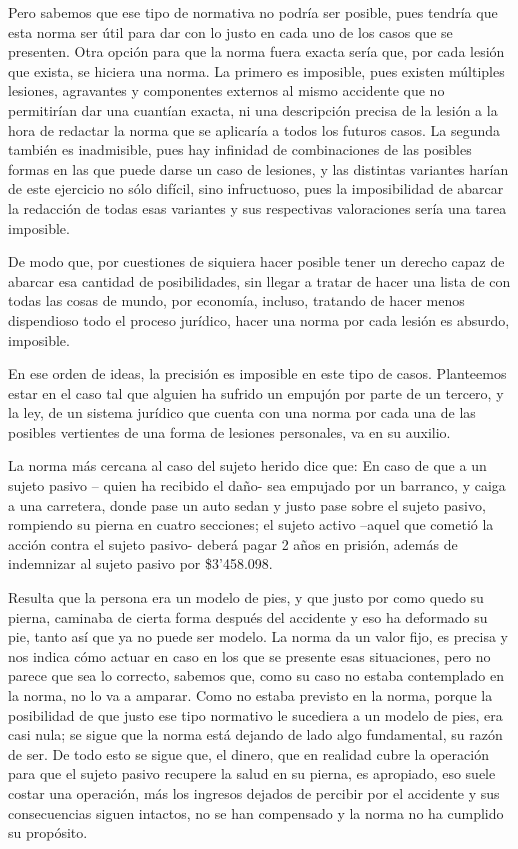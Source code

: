 \documentclass[]{book}
\begin{document}
\begin{refsection}
Pero sabemos que ese tipo de normativa no podría ser posible, pues
tendría que esta norma ser útil para dar con lo justo en cada uno de los
casos que se presenten. Otra opción para que la norma fuera exacta sería
que, por cada lesión que exista, se hiciera una norma. La primero es
imposible, pues existen múltiples lesiones, agravantes y componentes
externos al mismo accidente que no permitirían dar una cuantían exacta,
ni una descripción precisa de la lesión a la hora de redactar la norma
que se aplicaría a todos los futuros casos. La segunda también es
inadmisible, pues hay infinidad de combinaciones de las posibles formas
en las que puede darse un caso de lesiones, y las distintas variantes
harían de este ejercicio no sólo difícil, sino infructuoso, pues la
imposibilidad de abarcar la redacción de todas esas variantes y sus
respectivas valoraciones sería una tarea imposible.

De modo que, por cuestiones de siquiera hacer posible tener un derecho
capaz de abarcar esa cantidad de posibilidades, sin llegar a tratar de
hacer una lista de con todas las cosas de mundo, por economía, incluso,
tratando de hacer menos dispendioso todo el proceso jurídico, hacer una
norma por cada lesión es absurdo, imposible.

En ese orden de ideas, la precisión es imposible en este tipo de casos.
Planteemos estar en el caso tal que alguien ha sufrido un empujón por
parte de un tercero, y la ley, de un sistema jurídico que cuenta con una
norma por cada una de las posibles vertientes de una forma de lesiones
personales, va en su auxilio.

La norma más cercana al caso del sujeto herido dice que: En caso de que
a un sujeto pasivo -- quien ha recibido el daño- sea empujado por un
barranco, y caiga a una carretera, donde pase un auto sedan y justo pase
sobre el sujeto pasivo, rompiendo su pierna en cuatro secciones; el
sujeto activo --aquel que cometió la acción contra el sujeto pasivo-
deberá pagar 2 años en prisión, además de indemnizar al sujeto pasivo
por \$3'458.098.

Resulta que la persona era un modelo de pies, y que justo por como quedo
su pierna, caminaba de cierta forma después del accidente y eso ha
deformado su pie, tanto así que ya no puede ser modelo. La norma da un
valor fijo, es precisa y nos indica cómo actuar en caso en los que se
presente esas situaciones, pero no parece que sea lo correcto, sabemos
que, como su caso no estaba contemplado en la norma, no lo va a amparar.
Como no estaba previsto en la norma, porque la posibilidad de que justo
ese tipo normativo le sucediera a un modelo de pies, era casi nula; se
sigue que la norma está dejando de lado algo fundamental, su razón de
ser. De todo esto se sigue que, el dinero, que en realidad cubre la
operación para que el sujeto pasivo recupere la salud en su pierna, es
apropiado, eso suele costar una operación, más los ingresos dejados de
percibir por el accidente y sus consecuencias siguen intactos, no se han
compensado y la norma no ha cumplido su propósito.


\end{refsection}
\end{document}
